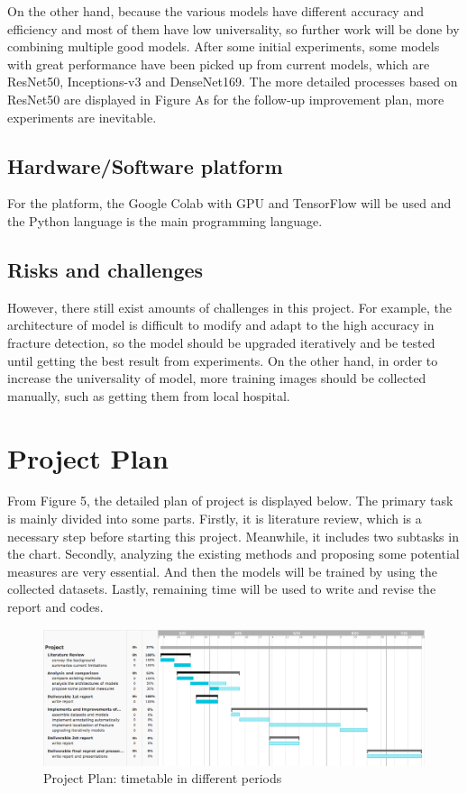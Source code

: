 \documentclass[12pt,oneside,a4paper]{article}
\begin{document}
\par On the other hand, because the various models have different accuracy and efficiency and most of them have low universality, so further work will be done by combining multiple good models. After some initial experiments, some models with great performance have been picked up from current models, which are ResNet50, Inceptions-v3 and DenseNet169. The more detailed processes based on ResNet50 are displayed in Figure As for the follow-up improvement plan, more experiments are inevitable. 



\subsection{Hardware/Software platform}
For the platform, the Google Colab with GPU and TensorFlow will be used and the Python language is the main programming language. 
\subsection{Risks and challenges}
However, there still exist amounts of challenges in this project. For example, the architecture of model is difficult to modify and adapt to the high accuracy in fracture detection, so the model should be upgraded iteratively and be tested until getting the best result from experiments. On the other hand, in order to increase the universality of model, more training images should be collected manually, such as getting them from local hospital.


\clearpage
\section{Project Plan}
From Figure 5, the detailed plan of project is displayed below. The primary task is mainly divided into some parts. Firstly, it is literature review, which is a necessary step before starting this project. Meanwhile, it includes two subtasks in the chart. Secondly, analyzing the existing methods and proposing some potential measures are very essential. And then the models will be trained by using the collected datasets. Lastly, remaining time will be used to write and revise the report and codes.

\begin{figure}
\begin{center}
\includegraphics[width=1\columnwidth]{images/TaskGantt.png}
\caption{Project Plan: timetable in different periods}
\end{center}
\end{figure}
\end{document}
